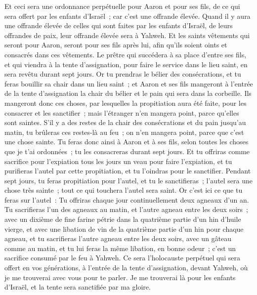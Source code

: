 \begin{multicols}{2}
Et ceci sera une ordonnance perpétuelle pour Aaron et pour ses fils, de ce qui sera offert par les enfants d'Israël~; car c'est une offrande élevée. Quand il y aura une offrande élevée de celles qui sont faites par les enfants d'Israël, de leurs offrandes de paix, leur offrande élevée sera à Yahweh.
Et les saints vêtements qui seront pour Aaron, seront pour ses fils après lui, afin qu'ils soient oints et consacrés dans ces vêtements.
Le prêtre qui succédera à sa place d'entre ses fils, et qui viendra à la tente d'assignation, pour faire le service dans le lieu saint, en sera revêtu durant sept jours.
Or tu prendras le bélier des consécrations, et tu feras bouillir sa chair dans un lieu saint~;
et Aaron et ses fils mangeront à l'entrée de la tente d'assignation la chair du bélier et le pain qui sera dans la corbeille.
Ils mangeront donc ces choses, par lesquelles la propitiation aura été faite, pour les consacrer et les sanctifier~; mais l'étranger n'en mangera point, parce qu'elles sont saintes.
S'il y a des restes de la chair des consécrations et du pain jusqu'au matin, tu brûleras ces restes-là au feu~; on n'en mangera point, parce que c'est une chose sainte.
Tu feras donc ainsi à Aaron et à ses fils, selon toutes les choses que je t'ai ordonnées~; tu les consacreras durant sept jours.
Et tu offriras comme sacrifice pour l'expiation tous les jours un veau pour faire l'expiation, et tu purifieras l'autel par cette propitiation, et tu l'oindras pour le sanctifier.
Pendant sept jours, tu feras propitiation pour l'autel, et tu le sanctifieras~; l'autel sera une chose très sainte~; tout ce qui touchera l'autel sera saint.
Or c'est ici ce que tu feras sur l'autel~: Tu offriras chaque jour continuellement deux agneaux d'un an.
Tu sacrifieras l'un des agneaux au matin, et l'autre agneau entre les deux soirs~;
avec un dixième de fine farine pétrie dans la quatrième partie d'un hin d'huile vierge, et avec une libation de vin de la quatrième partie d'un hin pour chaque agneau,
et tu sacrifieras l'autre agneau entre les deux soirs, avec un gâteau comme au matin, et tu lui feras la même libation, en bonne odeur~; c'est un sacrifice consumé par le feu à Yahweh.
Ce sera l'holocauste perpétuel qui sera offert en vos générations, à l'entrée de la tente d'assignation, devant Yahweh, où je me trouverai avec vous pour te parler.
Je me trouverai là pour les enfants d'Israël, et la tente sera sanctifiée par ma gloire.

\end{multicols}
